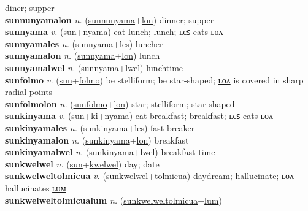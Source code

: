diner; supper \label{sunnunyamales} \\
\textbf{sunnunyamalon} \textit{n.} (\hyperref[sunnunyama]{sunnunyama}+\hyperref[lon]{lon})
dinner; supper \label{sunnunyamalon} \\
\textbf{sunnyama} \textit{v.} (\hyperref[sun]{sun}+\hyperref[nyama]{nyama})
eat lunch; lunch; \hyperref[sunnyamales]{ʟєꜱ} eats \hyperref[sunnyamalon]{ʟᴏᴧ} \label{sunnyama} \\
\textbf{sunnyamales} \textit{n.} (\hyperref[sunnyama]{sunnyama}+\hyperref[les]{les})
luncher \label{sunnyamales} \\
\textbf{sunnyamalon} \textit{n.} (\hyperref[sunnyama]{sunnyama}+\hyperref[lon]{lon})
lunch \label{sunnyamalon} \\
\textbf{sunnyamalwel} \textit{n.} (\hyperref[sunnyama]{sunnyama}+\hyperref[lwel]{lwel})
lunchtime \label{sunnyamalwel} \\
\textbf{sunfolmo} \textit{v.} (\hyperref[sun]{sun}+\hyperref[folmo]{folmo})
be stelliform; be star-shaped; \hyperref[sunfolmolon]{ʟᴏᴧ} is covered in sharp radial points \label{sunfolmo} \\
\textbf{sunfolmolon} \textit{n.} (\hyperref[sunfolmo]{sunfolmo}+\hyperref[lon]{lon})
star; stelliform; star-shaped \label{sunfolmolon} \\
\textbf{sunkinyama} \textit{v.} (\hyperref[sun]{sun}+\hyperref[ki]{ki}+\hyperref[nyama]{nyama})
eat breakfast; breakfast; \hyperref[sunkinyamales]{ʟєꜱ} eats \hyperref[sunkinyamalon]{ʟᴏᴧ} \label{sunkinyama} \\
\textbf{sunkinyamales} \textit{n.} (\hyperref[sunkinyama]{sunkinyama}+\hyperref[les]{les})
fast-breaker \label{sunkinyamales} \\
\textbf{sunkinyamalon} \textit{n.} (\hyperref[sunkinyama]{sunkinyama}+\hyperref[lon]{lon})
breakfast \label{sunkinyamalon} \\
\textbf{sunkinyamalwel} \textit{n.} (\hyperref[sunkinyama]{sunkinyama}+\hyperref[lwel]{lwel})
breakfast time \label{sunkinyamalwel} \\
\textbf{sunkwelwel} \textit{n.} (\hyperref[sun]{sun}+\hyperref[kwelwel]{kwelwel})
day; date \label{sunkwelwel} \\
\textbf{sunkwelweltolmicua} \textit{v.} (\hyperref[sunkwelwel]{sunkwelwel}+\hyperref[tolmicua]{tolmicua})
daydream; hallucinate; \hyperref[sunkwelweltolmicualon]{ʟᴏᴧ} hallucinates \hyperref[sunkwelweltolmicualum]{ʟᴜᴍ} \label{sunkwelweltolmicua} \\
\textbf{sunkwelweltolmicualum} \textit{n.} (\hyperref[sunkwelweltolmicua]{sunkwelweltolmicua}+\hyperref[lum]{lum})
